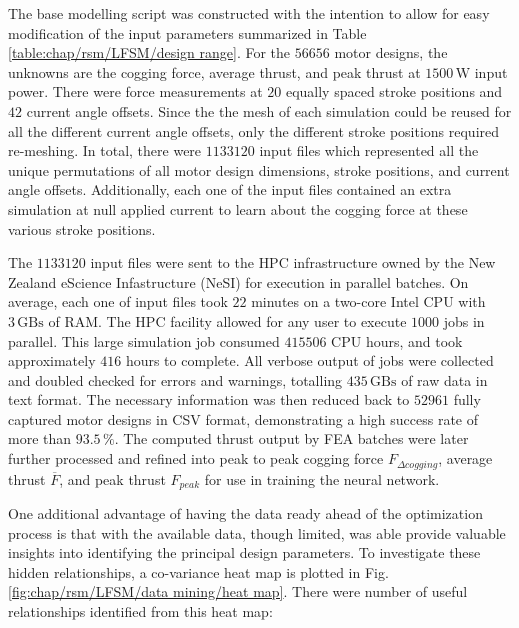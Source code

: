             
            The base modelling script was constructed with the intention to allow for easy modification of the input parameters summarized in Table\,\ref{table:chap/rsm/LFSM/design range}. For the $56656$ motor designs, the unknowns are the cogging force, average thrust, and peak thrust at $1500\,\mathrm{W}$ input power. There were force measurements at $20$ equally spaced stroke positions and $42$ current angle offsets. Since the the mesh of each simulation could be reused for all the different current angle offsets, only the different stroke positions required re-meshing. In total, there were $1133120$ input files which represented all the unique permutations of all motor design dimensions, stroke positions, and current angle offsets. Additionally, each one of the input files contained an extra simulation at null applied current to learn about the cogging force at these various stroke positions. 
            
            
            The $1133120$ input files were sent to the \acf{HPC} infrastructure owned by the New Zealand eScience Infastructure (NeSI) for execution in parallel batches. On average, each one of input files took $22$ minutes on a two-core Intel CPU with $3\,\mathrm{GBs}$ of RAM. The \acs{HPC} facility allowed for any user to execute $1000$ jobs in parallel. This large simulation job consumed $415506$ CPU hours, and took approximately $416$ hours to complete. All verbose output of jobs were collected and doubled checked for errors and warnings, totalling $435\,\mathrm{GBs}$ of raw data in text format. The necessary information was then reduced back to $52961$ fully captured motor designs in CSV format, demonstrating a high success rate of more than $93.5\,\%$. The computed thrust output by \acs{FEA} batches were later further processed and refined into peak to peak cogging force $F_{\Delta cogging}$, average thrust $\overline{F}$, and peak thrust $F_{peak}$ for use in training the neural network.
            
            
            One additional advantage of having the data ready ahead of the optimization process is that with the available data, though limited, was able provide valuable insights into identifying the principal design parameters. To investigate these hidden relationships, a co-variance heat map is plotted in Fig.\,\ref{fig:chap/rsm/LFSM/data mining/heat map}. There were number of useful relationships identified from this heat map:
            

